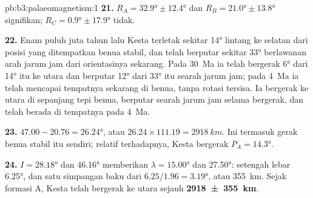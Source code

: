 \begin{solution}{pb:b3:palaeomagnetism:1}
\textbf{21.} $R_A = \ang{32.9} \pm \ang{12.4}$ dan $R_B = \ang{21.0} \pm
\ang{13.8}$ signifikan; $R_C = \ang{0.9} \pm \ang{17.9}$ tidak.

\textbf{22.} Enam puluh juta tahun lalu Kesta terletak sekitar \ang{14} lintang
ke selatan dari posisi yang ditempatkan benua stabil, dan telah berputar sekitar \ang{33}
berlawanan arah jarum jam dari orientasinya sekarang. Pada \qty{30}{Ma} ia telah bergerak
\ang{6} dari \ang{14} itu ke utara dan berputar \ang{12} dari \ang{33} itu
searah jarum jam; pada \qty{4}{Ma} ia telah mencapai tempatnya sekarang di benua,
tanpa rotasi tersisa. Ia bergerak ke utara di sepanjang tepi benua, berputar
searah jarum jam selama bergerak, dan telah berada di tempatnya pada \qty{4}{Ma}.

\textbf{23.} $47.00 - 20.76 = \ang{26.24}$, atau $26.24\times111.19 =
\qty{2918}{km}$. Ini termasuk gerak benua stabil itu sendiri;
relatif terhadapnya, Kesta bergerak $P_A = \ang{14.3}$.

\textbf{24.} $I = \ang{28.18}$ dan \ang{46.16} memberikan $\lambda = \ang{15.00}$ dan
\ang{27.50}: setengah lebar \ang{6.25}, dan satu simpangan baku dari
$6.25/1.96 = \ang{3.19}$, atau \qty{355}{km}. Sejak formasi A, Kesta telah bergerak
ke utara sejauh
\textbf{\qty[text-series-to-math=true]{2918 \pm 355}{km}}.
\end{solution}
